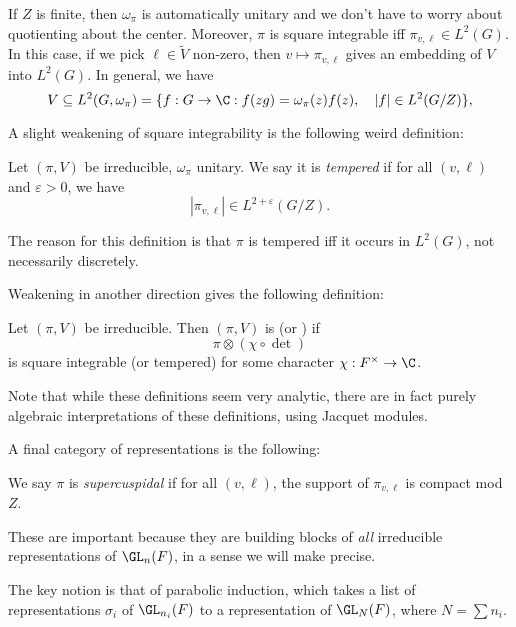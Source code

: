 \documentclass[a4paper]{article}
\begin{document}
If $Z$ is finite, then $\omega_\pi$ is automatically unitary and we don't have to worry about quotienting about the center. Moreover, $\pi$ is square integrable iff $\pi_{v, \ell} \in L^2(G)$. In this case, if we pick $\ell \in \tilde{V}$ non-zero, then $v \mapsto \pi_{v, \ell}$ gives an embedding of $V$ into $L^2(G)$. In general, we have
\[
  V \subseteq L^2(G, \omega_\pi) = \{f: G \to \C: f(zg) = \omega_\pi(z) f(z),\quad |f| \in L^2(G/Z)\},
\]

A slight weakening of square integrability is the following weird definition:
\begin{defi}
  Let $(\pi, V)$ be irreducible, $\omega_\pi$ unitary. We say it is \emph{tempered} if for all $(v, \ell)$ and $\varepsilon > 0$, we have
  \[
    |\pi_{v, \ell}| \in L^{2 + \varepsilon}(G/Z).
  \]
\end{defi}
The reason for this definition is that $\pi$ is tempered iff it occurs in $L^2(G)$, not necessarily discretely. %

Weakening in another direction gives the following definition:
\begin{defi}
  Let $(\pi, V)$ be irreducible. Then $(\pi, V)$ is  (or ) if
  \[
    \pi \otimes (\chi \circ \det)
  \]
  is square integrable (or tempered) for some character $\chi: F^\times \to \C$.
\end{defi}

Note that while these definitions seem very analytic, there are in fact purely algebraic interpretations of these definitions, using Jacquet modules.

A final category of representations is the following:
\begin{defi}
  We say $\pi$ is \emph{supercuspidal} if for all $(v, \ell)$, the support of $\pi_{v, \ell}$ is compact mod $Z$.
\end{defi}

These are important because they are building blocks of \emph{all} irreducible representations of $\GL_n(F)$, in a sense we will make precise.

The key notion is that of parabolic induction, which takes a list of representations $\sigma_i$ of $\GL_{n_i}(F)$ to a representation of $\GL_N(F)$, where $N = \sum n_i$.
\end{document}
